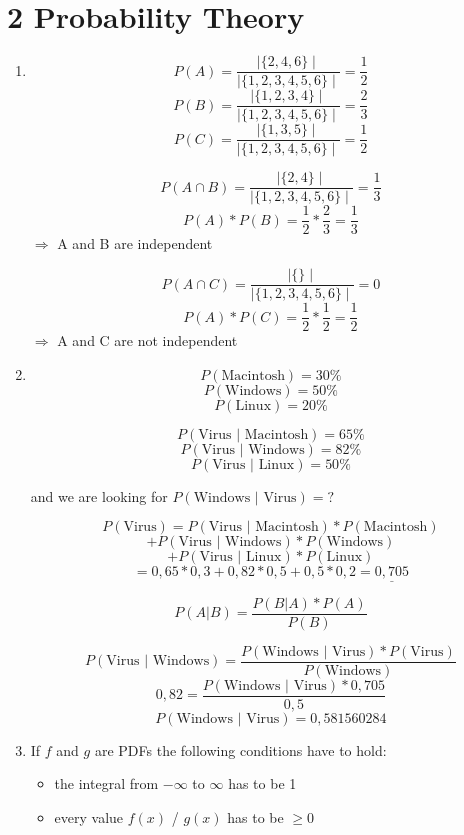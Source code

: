 \documentclass[12pt]{article}
\begin{document}
\section*{2 Probability Theory}
\begin{enumerate}[1)]
    \item 
        $$ P(A)= \frac{\mid \{2,4,6\} \mid}{\mid \{1,2,3,4,5,6\} \mid} = \frac{1}{2}$$ 
        $$ P(B)= \frac{\mid \{1,2,3,4\} \mid}{\mid \{1,2,3,4,5,6\} \mid} = \frac{2}{3}$$ 
        $$ P(C)= \frac{\mid \{1,3,5\} \mid}{\mid \{1,2,3,4,5,6\} \mid} = \frac{1}{2}$$ 
        
        $$ P(A \cap B)= \frac{\mid \{2,4\} \mid}{\mid \{1,2,3,4,5,6\} \mid} = \frac{1}{3}$$ 
        $$ P(A) * P(B) = \frac{1}{2} * \frac{2}{3} = \frac{1}{3} $$
        $ \Rightarrow $ A and B are independent
        
        $$ P(A \cap C)= \frac{\mid \{\} \mid}{\mid \{1,2,3,4,5,6\} \mid} = 0$$ 
        $$ P(A) * P(C) = \frac{1}{2} * \frac{1}{2} = \frac{1}{2} $$
        $ \Rightarrow $ A and C are not independent
        
    \item
        $$ P(\text{Macintosh}) = 30\% $$
        $$ P(\text{Windows})= 50\% $$
        $$ P(\text{Linux})= 20\% $$

        $$ P( \text{Virus } \vert \text{ Macintosh}) = 65\% $$
        $$ P( \text{Virus } \vert \text{ Windows}) = 82\% $$
        $$ P( \text{Virus } \vert \text{ Linux}) = 50\% $$

        and we are looking for $P(\text{Windows } \vert \text{ Virus}) = \text{?}$

        $$ P( \text{Virus}) = P( \text{Virus } \vert \text{ Macintosh}) * P( \text{Macintosh}) $$
        $$+ P( \text{Virus } \vert \text{ Windows}) * P( \text{Windows}) $$
        $$+ P( \text{Virus } \vert \text{ Linux}) * P( \text{Linux}) $$
        $$ = 0,65*0,3 + 0,82*0,5 + 0,5 * 0,2 = \underline{0,705} $$

        $$ P(A \vert B) = \frac{P(B \vert A) * P(A)}{P(B)} $$

        $$ P( \text{Virus } \vert \text{ Windows}) = \frac{ P( \text{Windows } \vert \text{ Virus}) * P( \text{Virus})}{P( \text{Windows})} $$
        $$ 0,82 = \frac{ P( \text{Windows } \vert \text{ Virus}) * 0,705}{0,5}$$
        $$ P( \text{Windows } \vert \text{ Virus}) = 0,581560284 $$

    \item
        If $f$ and $g$ are PDFs the following conditions have to hold:
        \begin{itemize}
            \item 
                the integral from $-\infty$ to $\infty$ has to be 1
            \item
                every value $f(x)$ / $g(x)$ has to be $\geq 0$
        \end{itemize}


\end{enumerate}
\end{document}
